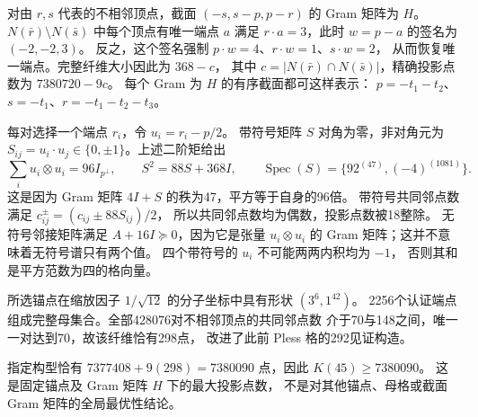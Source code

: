 对由 $r,s$ 代表的不相邻顶点，截面 $(-s,s-p,p-r)$ 的 Gram 矩阵为 $H$。
$N(\bar r)\setminus N(\bar s)$ 中每个顶点有唯一端点 $a$ 满足
$r\cdot a=3$，此时 $w=p-a$ 的签名为 $(-2,-2,3)$。
反之，这个签名强制 $p\cdot w=4$、$r\cdot w=1$、$s\cdot w=2$，
从而恢复唯一端点。完整纤维大小因此为 $368-c$，
其中 $c=|N(\bar r)\cap N(\bar s)|$，精确投影点数为 $7380720-9c$。
每个 Gram 为 $H$ 的有序截面都可这样表示：
$p=-t_1-t_2$、$s=-t_1$、$r=-t_1-t_2-t_3$。

每对选择一个端点 $r_i$，令 $u_i=r_i-p/2$。
带符号矩阵 $S$ 对角为零，非对角元为
$S_{ij}=u_i\cdot u_j\in\{0,\pm1\}$。上述二阶矩给出
\[
\sum_i u_i\otimes u_i=96I_{p^\perp},\qquad
S^2=88S+368I,\qquad
\operatorname{Spec}(S)=\{92^{(47)},(-4)^{(1081)}\}.
\]
这是因为 Gram 矩阵 $4I+S$ 的秩为47，平方等于自身的96倍。
带符号共同邻点数满足 $c_{ij}^{\pm}=(c_{ij}\pm88S_{ij})/2$，
所以共同邻点数均为偶数，投影点数被18整除。
无符号邻接矩阵满足 $A+16I\succeq0$，因为它是张量 $u_i\otimes u_i$
的 Gram 矩阵；这并不意味着无符号谱只有两个值。
四个带符号的 $u_i$ 不可能两两内积均为 $-1$，
否则其和是平方范数为四的格向量。

所选锚点在缩放因子 $1/\sqrt{12}$ 的分子坐标中具有形状 $(3^6,1^{42})$。
2256个认证端点组成完整母集合。全部428076对不相邻顶点的共同邻点数
介于70与148之间，唯一一对达到70，故该纤维恰有298点，
改进了此前 Pless 格的292见证构造。

\begin{corollary}[45维构造]\label{cor:section45}
指定构型恰有 $7377408+9(298)=7380090$ 点，因此 $K(45)\ge7380090$。
这是固定锚点及 Gram 矩阵 $H$ 下的最大投影点数，
不是对其他锚点、母格或截面 Gram 矩阵的全局最优性结论。
\end{corollary}
